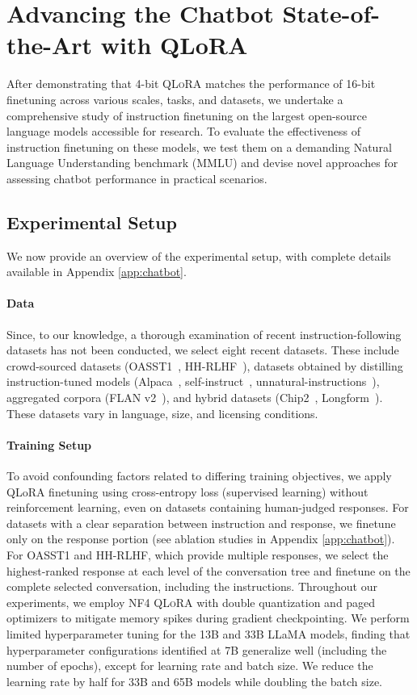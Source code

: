 \section{Advancing the Chatbot State-of-the-Art with QLoRA}
\label{sec:pushing}
After demonstrating that 4-bit \textsc{QLoRA} matches the performance of 16-bit finetuning across various scales, tasks, and datasets, we undertake a comprehensive study of instruction finetuning on the largest open-source language models accessible for research. To evaluate the effectiveness of instruction finetuning on these models, we test them on a demanding Natural Language Understanding benchmark (MMLU) and devise novel approaches for assessing chatbot performance in practical scenarios.

\subsection{Experimental Setup} We now provide an overview of the experimental setup, with complete details available in Appendix \ref{app:chatbot}.

\paragraph{Data} Since, to our knowledge, a thorough examination of recent instruction-following datasets has not been conducted, we select eight recent datasets. These include crowd-sourced datasets (OASST1~\citep{kopf2023openassistant}, HH-RLHF~\citep{bai2022training}), datasets obtained by distilling instruction-tuned models (Alpaca~\citep{alpaca}, self-instruct~\citep{wang2022self}, unnatural-instructions~\citep{honovich2022unnatural}), aggregated corpora (FLAN v2~\citep{chung2022scaling}), and hybrid datasets (Chip2~\citep{laion2023}, Longform~\citep{koksal2023longform}). These datasets vary in language, size, and licensing conditions.

\paragraph{Training Setup} To avoid confounding factors related to differing training objectives, we apply QLoRA finetuning using cross-entropy loss (supervised learning) without reinforcement learning, even on datasets containing human-judged responses. For datasets with a clear separation between instruction and response, we finetune only on the response portion (see ablation studies in Appendix \ref{app:chatbot}). For OASST1 and HH-RLHF, which provide multiple responses, we select the highest-ranked response at each level of the conversation tree and finetune on the complete selected conversation, including the instructions. Throughout our experiments, we employ NF4 \textsc{QLoRA} with double quantization and paged optimizers to mitigate memory spikes during gradient checkpointing. We perform limited hyperparameter tuning for the 13B and 33B LLaMA models, finding that hyperparameter configurations identified at 7B generalize well (including the number of epochs), except for learning rate and batch size. We reduce the learning rate by half for 33B and 65B models while doubling the batch size.

